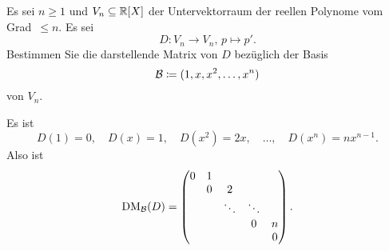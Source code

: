 \begin{question}
 Es sei $n \geq 1$ und $V_n \subseteq \mathbb{R}[X]$ der Untervektorraum der reellen Polynome vom \mbox{Grad $\leq n$}. Es sei
 \[
  D \colon V_n \to V_n, \, p \mapsto p'.
 \]
 Bestimmen Sie die darstellende Matrix von $D$ bezüglich der Basis
 \[
  \mathcal{B} \coloneqq (1, x, x^2, \dotsc, x^n)
 \]
 von $V_n$.
\end{question}
\begin{solution}
 Es ist
 \[
  D(1) = 0, \quad D(x) = 1, \quad D(x^2) = 2x, \quad \dotsc, \quad D(x^n) = n x^{n-1}.
 \]
 Also ist
 \[
  \operatorname{DM}_{\mathcal{B}}(D) =
  \begin{pmatrix}
   0 & 1 &        &        &   \\
     & 0 & 2      &        &   \\
     &   & \ddots & \ddots &   \\
     &   &        & 0      & n \\
     &   &        &        & 0
  \end{pmatrix}.
 \]
\end{solution}



